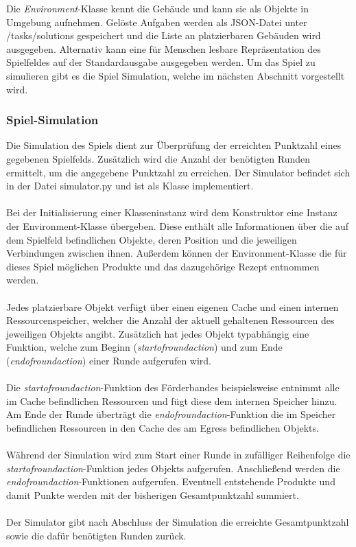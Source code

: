 Die \textit{Environment}-Klasse kennt die Gebäude und kann sie als Objekte in Umgebung aufnehmen. 
Gelöste Aufgaben werden als JSON-Datei unter /tasks/solutions gespeichert und die Liste an platzierbaren Gebäuden wird ausgegeben. Alternativ kann eine für Menschen lesbare Repräsentation des Spielfeldes auf der Standardausgabe ausgegeben werden.
Um das Spiel zu simulieren gibt es die Spiel Simulation, welche im nächsten Abschnitt vorgestellt wird.


\subsubsection{Spiel-Simulation}
Die Simulation des Spiels dient zur Überprüfung der erreichten Punktzahl eines gegebenen Spielfelds. Zusätzlich wird die Anzahl der benötigten Runden ermittelt, um die angegebene Punktzahl zu erreichen. Der Simulator befindet sich in der Datei simulator.py und ist als Klasse implementiert.
\\\\
Bei der Initialisierung einer Klasseninstanz wird dem Konstruktor eine Instanz der Environment-Klasse übergeben. Diese enthält alle Informationen über die auf dem Spielfeld befindlichen Objekte, deren Position und die jeweiligen Verbindungen zwischen ihnen. Außerdem können der Environment-Klasse die für dieses Spiel möglichen Produkte und das dazugehörige Rezept entnommen werden.
\\\\
Jedes platzierbare Objekt verfügt über einen eigenen Cache und einen internen Ressourcenspeicher, welcher die Anzahl der aktuell gehaltenen Ressourcen des jeweiligen Objekts angibt. Zusätzlich hat jedes Objekt typabhängig eine Funktion, welche zum Beginn (\textit{start\textunderscore{}of\textunderscore{}round\textunderscore{}action}) und zum Ende (\textit{end\textunderscore{}of\textunderscore{}round\textunderscore{}action}) einer Runde aufgerufen wird.
\\\\
Die \textit{start\textunderscore{}of\textunderscore{}round\textunderscore{}action}-Funktion des Förderbandes beispielsweise entnimmt alle im Cache befindlichen Ressourcen und fügt diese dem internen Speicher hinzu. Am Ende der Runde überträgt die  \textit{end\textunderscore{}of\textunderscore{}round\textunderscore{}action}-Funktion die im Speicher befindlichen Ressourcen in den Cache des am Egress befindlichen Objekts.
\\\\
Während der Simulation wird zum Start einer Runde in zufälliger Reihenfolge die \textit{start\textunderscore{}of\textunderscore{}round\textunderscore{}action}-Funktion jedes Objekts aufgerufen. Anschließend werden die \textit{end\textunderscore{}of\textunderscore{}round\textunderscore{}action}-Funktionen aufgerufen. Eventuell entstehende Produkte und damit Punkte werden mit der bisherigen Gesamtpunktzahl summiert.
\\\\
Der Simulator gibt nach Abschluss der Simulation die erreichte Gesamtpunktzahl sowie die dafür benötigten Runden zurück.

